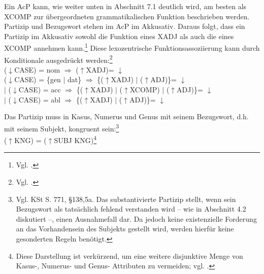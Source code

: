 \documentclass[12pt,a4paper]{article}
\begin{document}
Ein AcP kann, wie weiter unten in Abschnitt 7.1 deutlich wird, am besten als XCOMP zur übergeordneten grammatikalischen Funktion beschrieben werden. Partizip und Bezugswort stehen im AcP im Akkusativ. Daraus folgt, dass ein Partizip im Akkusativ sowohl die Funktion eines XADJ als auch die eines XCOMP annehmen kann.\footnote{Vgl. \cite[48]{Skript}.} Diese lexozentrische Funktionsassoziierung kann durch Konditionale ausgedrückt werden:\footnote{Vgl. \cite[48]{Skript}.} \\
($\downarrow$CASE) = nom $\Rightarrow$ ($\uparrow$XADJ)= $\downarrow$ \\
($\downarrow$CASE) = \{gen $\mid$ dat\} $\Rightarrow$ \{($\uparrow$XADJ) $\mid$ ($\uparrow$ADJ)\}= $\downarrow$ \\
$\mid$ ($\downarrow$CASE) = acc $\Rightarrow$ \{($\uparrow$XADJ) $\mid$ ($\uparrow$XCOMP) $\mid$ ($\uparrow$ADJ)\}= $\downarrow$ \\
$\mid$ ($\downarrow$CASE) = abl $\Rightarrow$ \{($\uparrow$XADJ) $\mid$ ($\uparrow$ADJ)\}= $\downarrow$ 

Das Partizip muss in Kasus, Numerus und Genus mit seinem Bezugswort, d.h. mit seinem Subjekt, kongruent sein:\footnote{Vgl. KSt S. 771, §138,5a. Das substantivierte Partizip stellt, wenn sein Bezugswort als tatsächlich fehlend verstanden wird -- wie in Abschnitt 4.2 diskutiert --, einen Ausnahmefall dar. Da jedoch keine existenzielle Forderung an das Vorhandensein des Subjekts gestellt wird, werden hierfür keine gesonderten Regeln benötigt.}\\ 
($\uparrow$KNG) = ($\uparrow$SUBJ KNG)\footnote{Diese Darstellung ist verkürzend, um eine weitere disjunktive Menge von Kasus-, Numerus- und Genus- Attributen zu vermeiden; vgl. \cite[49]{Skript}.}
\end{document}
